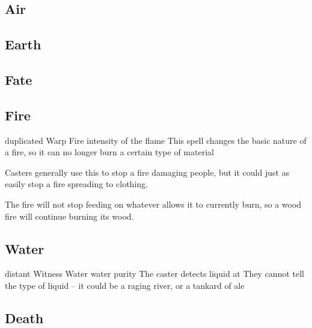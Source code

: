 \begin{multicols}{2}

\subsection{Air}


\subsection{Earth}


\subsection{Fate}


\subsection{Fire}


  {duplicated}%
  {Warp}%
  {Fire}%
  {intensity of the flame}%
  {This spell changes the basic nature of a fire, so it can no longer burn a certain type of material}%
  {Casters generally use this to stop a fire damaging people, but it could just as easily stop a fire spreading to clothing.

    The fire will not stop feeding on whatever allows it to currently burn, so a wood fire will continue burning its wood.}

\subsection{Water}


  {distant}%
  {Witness}%
  {Water}%
  {water purity}%
  {The caster detects liquid at \spellRange}%
  {They cannot tell the type of liquid -- it could be a raging river, or a tankard of ale}

\subsection{Death}


\end{multicols}
